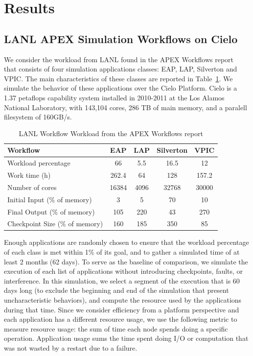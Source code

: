 \section{Results}\label{sec:results}

\subsection{LANL APEX Simulation Workflows on Cielo}

We consider the workload from LANL found in the APEX Workflows
report~\cite{apex} that consists of four simulation applications
classes: EAP, LAP, Silverton and VPIC. The main characteristics of
these classes are reported in Table~\ref{table:lanl}. We simulate the
behavior of these applications over the Cielo Platform. Cielo is a
1.37 petaflops capability system installed in 2010-2011 at the Los
Alamos National Laboratory, with 143,104 cores, 286 TB of main memory,
and a paralell filesystem of 160GB/s.

\begin{table}
\begin{tabular}{|l|c|c|c|c|}
\hline
 Workflow & EAP & LAP & Silverton & VPIC \\\hline
Workload percentage & 66 & 5.5 & 16.5 & 12 \\\hline
Work time (h) & 262.4 & 64 & 128 & 157.2 \\\hline
Number of cores & 16384 & 4096 & 32768 & 30000 \\\hline
Initial Input (\% of memory) &  3 & 5 & 70 & 10 \\\hline
Final Output (\% of memory) & 105 & 220 & 43 & 270 \\\hline
Checkpoint Size (\% of memory) & 160 & 185 & 350 & 85 \\\hline
\end{tabular}
\caption{LANL Workflow Workload from the APEX Workflows report\label{table:lanl}}
\end{table}

Enough applications are randomly chosen to ensure that the workload
percentage of each class is met within 1\% of its goal, and to gather
a simulated time of at least 2 months (62 days). To serve as the
baseline of comparison, we simulate the execution of each list of
applications without introducing checkpoints, faults, or
interference. In this simulation, we select a segment of the execution
that is 60 days long (to exclude the beginning and end of the
simulation that present uncharacteristic behaviors), and compute
the resource used by the applications during that time. Since we
consider efficiency from a platform perspective and each application
has a different resource usage, we use the following metric to measure
resource usage: the sum of time each node spends doing a specific
operation. Application usage sums the time spent doing I/O or
computation that was not wasted by a restart due to a failure.


